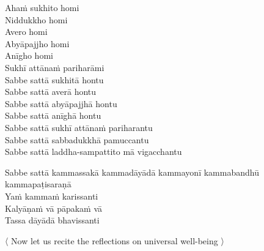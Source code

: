 Ahaṁ sukhito homi\\
Niddukkho homi\\
Avero homi\\
Abyāpajjho homi\\
Anīgho homi\\
Sukhī attānaṁ pariharāmi\\
Sabbe sattā sukhitā hontu\\
Sabbe sattā averā hontu\\
Sabbe sattā abyāpajjhā hontu\\
Sabbe sattā anīghā hontu\\
Sabbe sattā sukhī attānaṁ pariharantu\\
Sabbe sattā sabbadukkhā pamuccantu\\
Sabbe sattā laddha-sampattito mā vigacchantu

Sabbe sattā kammassakā kammadāyādā kammayonī kammabandhū kammapaṭisaraṇā\\
Yaṁ kammaṁ karissanti\\
Kalyāṇaṁ vā pāpakaṁ vā\\
Tassa dāyādā bhavissanti

\clearpage

\begin{leader-english}
  〈 Now let us recite the reflections on universal well-being 〉
\end{leader-english}

